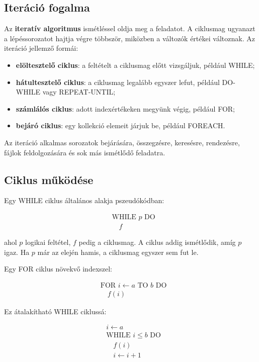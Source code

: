 \subsection{Iteráció fogalma}

Az \textbf{iteratív algoritmus} ismétléssel oldja meg a feladatot. A ciklusmag ugyanazt a lépéssorozatot hajtja végre többször, miközben a változók értékei változnak. Az iteráció jellemző formái:

\begin{itemize}
  \item \textbf{elöltesztelő ciklus}: a feltételt a ciklusmag előtt vizsgáljuk, például WHILE;
  \item \textbf{hátultesztelő ciklus}: a ciklusmag legalább egyszer lefut, például DO-WHILE vagy REPEAT-UNTIL;
  \item \textbf{számlálós ciklus}: adott indexértékeken megyünk végig, például FOR;
  \item \textbf{bejáró ciklus}: egy kollekció elemeit járjuk be, például FOREACH.
\end{itemize}

Az iteráció alkalmas sorozatok bejárására, összegzésre, keresésre, rendezésre, fájlok feldolgozására és sok más ismétlődő feladatra.

\subsection{Ciklus működése}

Egy WHILE ciklus általános alakja pszeudókódban:

\[
\begin{aligned}
&\text{WHILE } p \text{ DO}\\
&\quad f
\end{aligned}
\]

ahol $p$ logikai feltétel, $f$ pedig a ciklusmag. A ciklus addig ismétlődik, amíg $p$ igaz. Ha $p$ már az elején hamis, a ciklusmag egyszer sem fut le.

Egy FOR ciklus növekvő indexszel:

\[
\begin{aligned}
&\text{FOR } i\leftarrow a \text{ TO } b \text{ DO}\\
&\quad f(i)
\end{aligned}
\]

Ez átalakítható WHILE ciklussá:

\[
\begin{aligned}
&i\leftarrow a\\
&\text{WHILE } i\leq b \text{ DO}\\
&\quad f(i)\\
&\quad i\leftarrow i+1
\end{aligned}
\]

